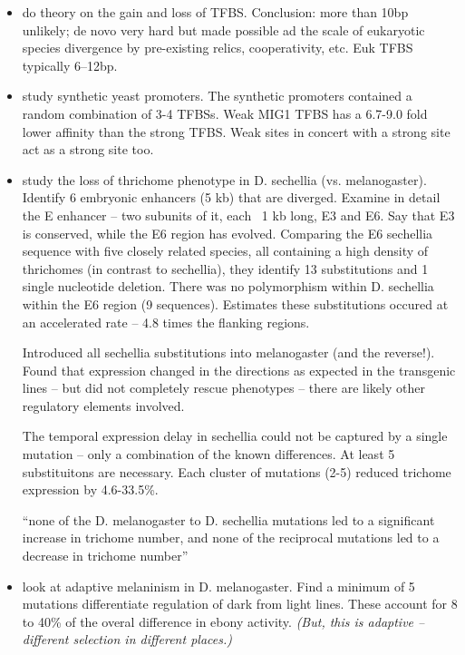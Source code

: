 \documentclass{article}
\begin{document}
\begin{itemize}
    \item \citet{tugrul2015dynamics} do theory on the gain and loss of TFBS.  
        Conclusion: more than 10bp unlikely; de novo very hard but made possible ad the scale of eukaryotic species divergence by pre-existing relics, cooperativity, etc.
        Euk TFBS typically 6--12bp.

  \item \citet{gertz2009analysis} study synthetic yeast promoters. The synthetic promoters contained a random combination of 3-4 TFBSs. Weak MIG1 TFBS has a 6.7-9.0 fold lower affinity than the strong TFBS. Weak sites in concert with a strong site act as a strong site too. 


  \item \citet{frankel2011morphological} study the loss of thrichome phenotype in D. sechellia (vs. melanogaster). Identify 6 embryonic enhancers (5 kb) that are diverged. Examine in detail the E enhancer -- two subunits of it, each ~1 kb long, E3 and E6. Say that E3 is conserved, while the E6 region has evolved. Comparing the E6 sechellia sequence with five closely related species, all containing a high density of thrichomes (in contrast to sechellia), they identify 13 substitutions and 1 single nucleotide deletion. There was no polymorphism within D. sechellia within the E6 region (9 sequences). Estimates these substitutions occured at an accelerated rate -- 4.8 times the flanking regions. 

    Introduced all sechellia substitutions into melanogaster (and the reverse!). Found that expression changed in the directions as expected in the transgenic lines -- but did not completely rescue phenotypes -- there are likely other regulatory elements involved. 

    The temporal expression delay in sechellia could not be captured by a single mutation -- only a combination of the known differences. At least 5 substituitons are necessary. Each cluster of mutations (2-5) reduced trichome expression by 4.6-33.5\%. 

    ``none of the D. melanogaster to D. sechellia mutations led to a significant increase in trichome number, and none of the reciprocal mutations led to a decrease in trichome number''

  \item \citet{rebeiz2009stepwise} look at adaptive melaninism in D. melanogaster. 
      Find a minimum of 5 mutations differentiate regulation of dark from light lines. These account for 8 to 40\% of the overal difference in ebony activity.  \emph{(But, this is adaptive -- different selection in different places.)}


\end{itemize}
\end{document}
